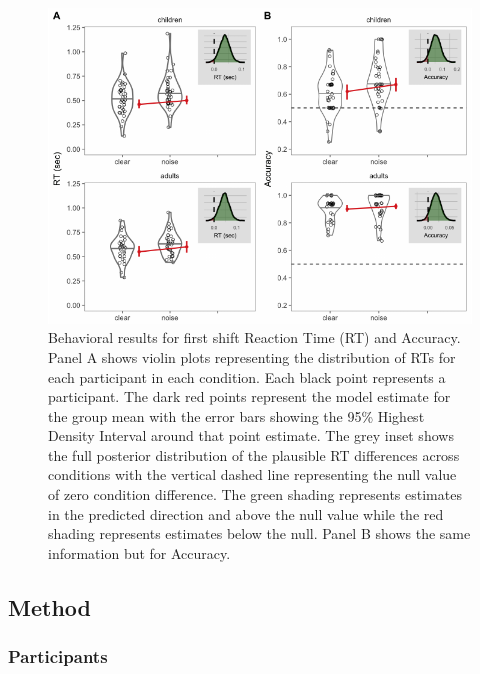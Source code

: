 \documentclass[10pt, letterpaper]{article}
\newenvironment{CodeChunk}{}{}
\begin{document}
\begin{CodeChunk}
\begin{figure}[t]

{\centering \includegraphics[width=0.85\linewidth]{figs/noise_acc_rt_e1_plot-1} 

}

\caption[Behavioral results for first shift Reaction Time (RT) and Accuracy]{Behavioral results for first shift Reaction Time (RT) and Accuracy. Panel A shows violin plots representing the distribution of RTs for each participant in each condition. Each black point represents a participant. The dark red points represent the model estimate for the group mean with the error bars showing the 95\% Highest Density Interval around that point estimate. The grey inset shows the full posterior distribution of the plausible RT differences across conditions with the vertical dashed line representing the null value of zero condition difference. The green shading represents estimates in the predicted direction and above the null value while the red shading represents estimates below the null. Panel B shows the same information but for Accuracy.}\label{fig:noise_acc_rt_e1_plot}
\end{figure}
\end{CodeChunk}

\subsection{Method}\label{method}

\subsubsection{Participants}\label{participants}
\end{document}
